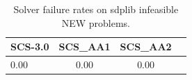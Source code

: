 \begin{table}
\centering
\caption{Solver failure rates on sdplib infeasible NEW problems.}
\label{t-sdplib infeasible NEW-failure}
\begin{tabular}{lccc}
\toprule
 SCS-3.0 &  SCS\_AA1 &  SCS\_AA2 \\
\midrule
    0.00 &     0.00 &     0.00 \\
\bottomrule
\end{tabular}
\end{table}
